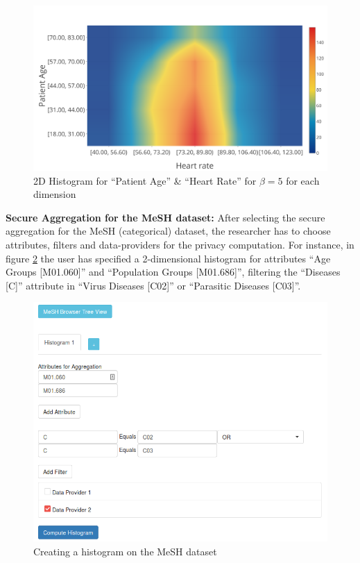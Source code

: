 \begin{figure}[H]
  \centering
  \includegraphics[width=0.8\columnwidth]{figures/cvi_histogram_results.png}
  \caption{2D Histogram for ``Patient Age'' \& ``Heart Rate'' for $\beta = 5$ for each dimension}
  \label{f:cvi-histogram-results}
\end{figure}


\textbf{Secure Aggregation for the MeSH dataset:} After selecting the secure aggregation for the MeSH (categorical) dataset, the researcher has to choose attributes, filters and data\hyp providers for the privacy computation.
For instance, in figure \ref{f:mesh-histogram} the user has specified a 2\hyp dimensional histogram for attributes ``Age Groups [M01.060]'' and ``Population Groups [M01.686]'', filtering the ``Diseases [C]'' attribute in ``Virus Diseases [C02]'' or ``Parasitic Diseases [C03]''.

\begin{figure}[H]
  \centering
  \includegraphics[width=0.8\columnwidth]{figures/mesh_histogram.png}
  \caption{Creating a histogram on the MeSH dataset}
  \label{f:mesh-histogram}
\end{figure}



